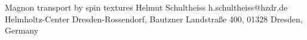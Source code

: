 \begin{conf-abstract}[]
{Magnon transport by spin textures}
{\color{blue} Helmut Schultheiss}
{h.schultheiss@hzdr.de}
{Helmholtz-Center Dresden-Rossendorf, Bautzner Landstraße 400, 01328 Dresden, Germany}
{\decofourleft \decofourright}





\printbibliography[heading=none]

\end{conf-abstract}
